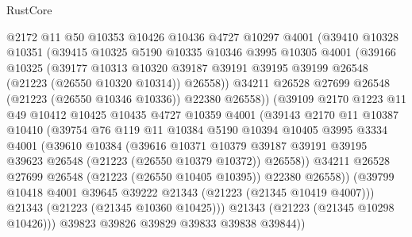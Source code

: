 \begin{lexlean}{RustCore}
\begin{coremodule}
              @2172
              @11
              @50
              @10353
              @10426
              @10436
              @4727
              @10297
              @4001
              (@39410
                @10328
                @10351
                (@39415
                  @10325
                  @5190
                  @10335
                  @10346
                  @3995
                  @10305
                  @4001
                  (@39166
                    @10325
                    (@39177
                      @10313
                      @10320
                      @39187
                      @39191
                      @39195
                      @39199
                      @26548
                      (@21223 (@26550 @10320 @10314))
                      @26558))
                  @34211
                  @26528
                  @27699
                  @26548
                  (@21223 (@26550 @10346 @10336))
                  @22380
                  @26558))
              (@39109
                @2170
                @1223
                @11
                @49
                @10412
                @10425
                @10435
                @4727
                @10359
                @4001
                (@39143
                  @2170
                  @11
                  @10387
                  @10410
                  (@39754
                    @76
                    @119
                    @11
                    @10384
                    @5190
                    @10394
                    @10405
                    @3995
                    @3334
                    @4001
                    (@39610
                      @10384
                      (@39616
                        @10371
                        @10379
                        @39187
                        @39191
                        @39195
                        @39623
                        @26548
                        (@21223 (@26550 @10379 @10372))
                        @26558))
                    @34211
                    @26528
                    @27699
                    @26548
                    (@21223 (@26550 @10405 @10395))
                    @22380
                    @26558))
                (@39799 @10418 @4001 @39645 @39222 @21343 (@21223 (@21345 @10419 @4007)))
                @21343
                (@21223 (@21345 @10360 @10425)))
              @21343
              (@21223 (@21345 @10298 @10426)))
            @39823
            @39826
            @39829
            @39833
            @39838
            @39844))

\end{coremodule}
\end{lexlean}
